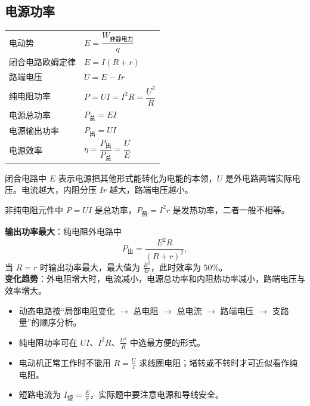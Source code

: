 
\subsection{电源功率}

\begin{tabularx}{\columnwidth}{XX}
  电动势&$E=\dfrac{W_{\text{非静电力}}}{q}$\\
  闭合电路欧姆定律&$E=I(R+r)$\\
  路端电压&$U=E-Ir$\\
  纯电阻功率&$P=UI=I^2R=\dfrac{U^2}{R}$\\
  电源总功率&$P_{\text{总}}=EI$\\
  电源输出功率&$P_{\text{出}}=UI$\\
  电源效率&$\eta=\dfrac{P_{\text{出}}}{P_{\text{总}}}=\dfrac{U}{E}$\\
\end{tabularx}

\begin{formulanotebox}
闭合电路中 $E$ 表示电源把其他形式能转化为电能的本领，$U$ 是外电路两端实际电压。电流越大，内阻分压 $Ir$ 越大，路端电压越小。

非纯电阻元件中 $P=UI$ 是总功率，$P_{\text{热}}=I^2r$ 是发热功率，二者一般不相等。
\end{formulanotebox}

\begin{keypointbox}[title={\strut\textcolor{white}{\bfseries 重点知识点：电源功率}}]
\textbf{输出功率最大}：纯电阻外电路中
\[
  P_{\text{出}}=\frac{E^2R}{(R+r)^2},
\]
当 $R=r$ 时输出功率最大，最大值为 $\frac{E^2}{4r}$，此时效率为 $50\%$。\\

\textbf{变化趋势}：外电阻增大时，电流减小，电源总功率和内阻热功率减小，路端电压与效率增大。
\end{keypointbox}

\begin{casetypebox}[title={\strut\textcolor{white}{\bfseries 常见题型：动态电路与功率极值}}]
\begin{itemize}[leftmargin=1.5em]
  \item 动态电路按“局部电阻变化 $\rightarrow$ 总电阻 $\rightarrow$ 总电流 $\rightarrow$ 路端电压 $\rightarrow$ 支路量”的顺序分析。
  \item 纯电阻功率可在 $UI$、$I^2R$、$\frac{U^2}{R}$ 中选最方便的形式。
  \item 电动机正常工作时不能用 $R=\frac{U}{I}$ 求线圈电阻；堵转或不转时才可近似看作纯电阻。
  \item 短路电流为 $I_{\text{短}}=\frac{E}{r}$，实际题中要注意电源和导线安全。
\end{itemize}
\end{casetypebox}
